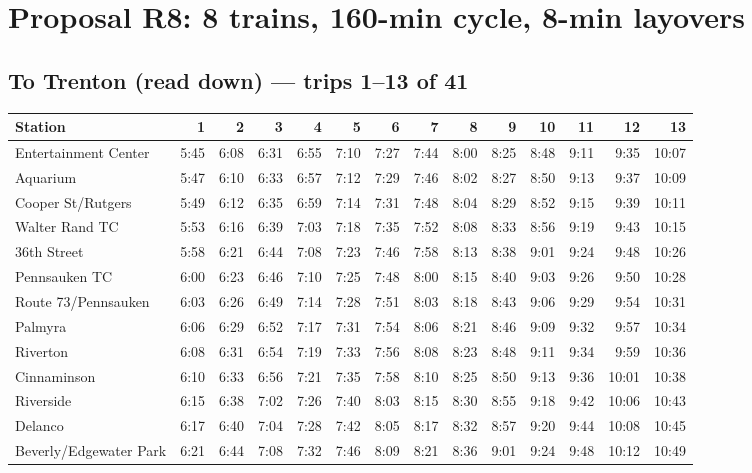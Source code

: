 \section{Proposal R8: 8 trains, 160-min cycle, 8-min layovers}\label{tt:proposal_R8}
\subsection*{To Trenton (read down) --- trips 1--13 of 41}
\begin{center}\footnotesize\setlength{\tabcolsep}{3pt}\begin{tabular}{@{}lrrrrrrrrrrrrr@{}}\toprule
Station & 1 & 2 & 3 & 4 & 5 & 6 & 7 & 8 & 9 & 10 & 11 & 12 & 13 \\\midrule
Entertainment Center & 5:45 & 6:08 & 6:31 & 6:55 & 7:10 & 7:27 & 7:44 & 8:00 & 8:25 & 8:48 & 9:11 & 9:35 & 10:07 \\
Aquarium & 5:47 & 6:10 & 6:33 & 6:57 & 7:12 & 7:29 & 7:46 & 8:02 & 8:27 & 8:50 & 9:13 & 9:37 & 10:09 \\
Cooper St/Rutgers & 5:49 & 6:12 & 6:35 & 6:59 & 7:14 & 7:31 & 7:48 & 8:04 & 8:29 & 8:52 & 9:15 & 9:39 & 10:11 \\
Walter Rand TC & 5:53 & 6:16 & 6:39 & 7:03 & 7:18 & 7:35 & 7:52 & 8:08 & 8:33 & 8:56 & 9:19 & 9:43 & 10:15 \\
36th Street & 5:58 & 6:21 & 6:44 & 7:08 & 7:23 & 7:46 & 7:58 & 8:13 & 8:38 & 9:01 & 9:24 & 9:48 & 10:26 \\
Pennsauken TC & 6:00 & 6:23 & 6:46 & 7:10 & 7:25 & 7:48 & 8:00 & 8:15 & 8:40 & 9:03 & 9:26 & 9:50 & 10:28 \\
Route 73/Pennsauken & 6:03 & 6:26 & 6:49 & 7:14 & 7:28 & 7:51 & 8:03 & 8:18 & 8:43 & 9:06 & 9:29 & 9:54 & 10:31 \\
Palmyra & 6:06 & 6:29 & 6:52 & 7:17 & 7:31 & 7:54 & 8:06 & 8:21 & 8:46 & 9:09 & 9:32 & 9:57 & 10:34 \\
Riverton & 6:08 & 6:31 & 6:54 & 7:19 & 7:33 & 7:56 & 8:08 & 8:23 & 8:48 & 9:11 & 9:34 & 9:59 & 10:36 \\
Cinnaminson & 6:10 & 6:33 & 6:56 & 7:21 & 7:35 & 7:58 & 8:10 & 8:25 & 8:50 & 9:13 & 9:36 & 10:01 & 10:38 \\
Riverside & 6:15 & 6:38 & 7:02 & 7:26 & 7:40 & 8:03 & 8:15 & 8:30 & 8:55 & 9:18 & 9:42 & 10:06 & 10:43 \\
Delanco & 6:17 & 6:40 & 7:04 & 7:28 & 7:42 & 8:05 & 8:17 & 8:32 & 8:57 & 9:20 & 9:44 & 10:08 & 10:45 \\
Beverly/Edgewater Park & 6:21 & 6:44 & 7:08 & 7:32 & 7:46 & 8:09 & 8:21 & 8:36 & 9:01 & 9:24 & 9:48 & 10:12 & 10:49 \\

\end{tabular}
\end{center}
